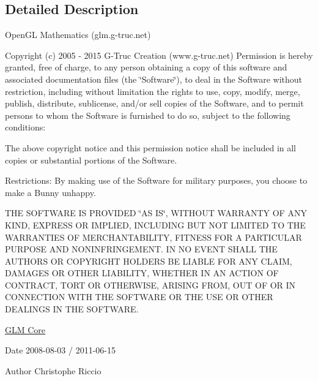 \subsection{Detailed Description}
Open\-G\-L Mathematics (glm.\-g-\/truc.\-net)

Copyright (c) 2005 -\/ 2015 G-\/\-Truc Creation (www.\-g-\/truc.\-net) Permission is hereby granted, free of charge, to any person obtaining a copy of this software and associated documentation files (the \char`\"{}\-Software\char`\"{}), to deal in the Software without restriction, including without limitation the rights to use, copy, modify, merge, publish, distribute, sublicense, and/or sell copies of the Software, and to permit persons to whom the Software is furnished to do so, subject to the following conditions\-:

The above copyright notice and this permission notice shall be included in all copies or substantial portions of the Software.

Restrictions\-: By making use of the Software for military purposes, you choose to make a Bunny unhappy.

T\-H\-E S\-O\-F\-T\-W\-A\-R\-E I\-S P\-R\-O\-V\-I\-D\-E\-D \char`\"{}\-A\-S I\-S\char`\"{}, W\-I\-T\-H\-O\-U\-T W\-A\-R\-R\-A\-N\-T\-Y O\-F A\-N\-Y K\-I\-N\-D, E\-X\-P\-R\-E\-S\-S O\-R I\-M\-P\-L\-I\-E\-D, I\-N\-C\-L\-U\-D\-I\-N\-G B\-U\-T N\-O\-T L\-I\-M\-I\-T\-E\-D T\-O T\-H\-E W\-A\-R\-R\-A\-N\-T\-I\-E\-S O\-F M\-E\-R\-C\-H\-A\-N\-T\-A\-B\-I\-L\-I\-T\-Y, F\-I\-T\-N\-E\-S\-S F\-O\-R A P\-A\-R\-T\-I\-C\-U\-L\-A\-R P\-U\-R\-P\-O\-S\-E A\-N\-D N\-O\-N\-I\-N\-F\-R\-I\-N\-G\-E\-M\-E\-N\-T. I\-N N\-O E\-V\-E\-N\-T S\-H\-A\-L\-L T\-H\-E A\-U\-T\-H\-O\-R\-S O\-R C\-O\-P\-Y\-R\-I\-G\-H\-T H\-O\-L\-D\-E\-R\-S B\-E L\-I\-A\-B\-L\-E F\-O\-R A\-N\-Y C\-L\-A\-I\-M, D\-A\-M\-A\-G\-E\-S O\-R O\-T\-H\-E\-R L\-I\-A\-B\-I\-L\-I\-T\-Y, W\-H\-E\-T\-H\-E\-R I\-N A\-N A\-C\-T\-I\-O\-N O\-F C\-O\-N\-T\-R\-A\-C\-T, T\-O\-R\-T O\-R O\-T\-H\-E\-R\-W\-I\-S\-E, A\-R\-I\-S\-I\-N\-G F\-R\-O\-M, O\-U\-T O\-F O\-R I\-N C\-O\-N\-N\-E\-C\-T\-I\-O\-N W\-I\-T\-H T\-H\-E S\-O\-F\-T\-W\-A\-R\-E O\-R T\-H\-E U\-S\-E O\-R O\-T\-H\-E\-R D\-E\-A\-L\-I\-N\-G\-S I\-N T\-H\-E S\-O\-F\-T\-W\-A\-R\-E.

\hyperlink{group__core}{G\-L\-M Core}

\begin{DoxyDate}{Date}
2008-\/08-\/03 / 2011-\/06-\/15 
\end{DoxyDate}
\begin{DoxyAuthor}{Author}
Christophe Riccio 
\end{DoxyAuthor}

